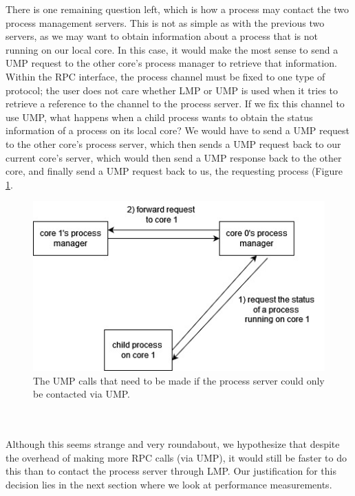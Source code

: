There is one remaining question left, which is how a process may contact the two process management servers. This is not as simple as with the previous two servers, as we may want to obtain information about a process that is not running on our local core. In this case, it would make the most sense to send a UMP request to the other core's process manager to retrieve that information. Within the RPC interface, the process channel must be fixed to one type of protocol; the user does not care whether LMP or UMP is used when it tries to retrieve a reference to the channel to the process server. If we fix this channel to use UMP, what happens when a child process wants to obtain the status information of a process on its local core? We would have to send a UMP request to the other core's process server, which then sends a UMP request back to our current core's server, which would then send a UMP response back to the other core, and finally send a UMP request back to us, the requesting process (Figure \ref{figure:m6-ump-proc}.
\begin{figure}[ht]
    \centering
    \includegraphics[width=0.8\columnwidth]{images/m6-ump-proc.jpg}
    \caption{The UMP calls that need to be made if the process server could only be contacted via UMP.}
    \label{figure:m6-ump-proc}
\end{figure}
\\\\
Although this seems strange and very roundabout, we hypothesize that despite the overhead of making more RPC calls (via UMP), it would still be faster to do this than to contact the process server through LMP. Our justification for this decision lies in the next section where we look at performance measurements. 

